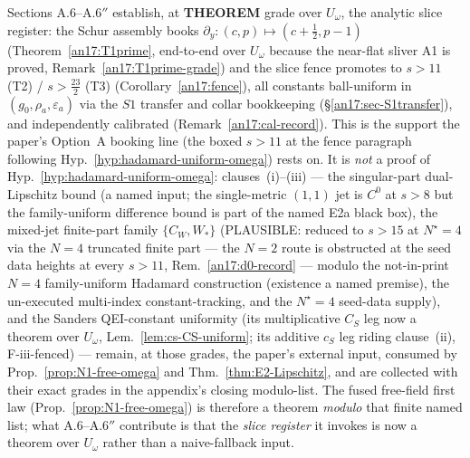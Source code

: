 \begin{remark}
\label{an17:slice-verdict}
Sections A.6--A.6$''$ establish, at \textbf{THEOREM} grade over $U_\omega$, the
analytic slice register: the Schur assembly books
$\partial_y:(c,p)\mapsto(c+\tfrac12,p-1)$ (Theorem~\ref{an17:T1prime}, end-to-end
over $U_\omega$ because the near-flat sliver A1 is proved,
Remark~\ref{an17:T1prime-grade}) and the slice fence promotes to $s>11$ (T2) /
$s>\tfrac{23}{2}$ (T3) (Corollary~\ref{an17:fence}), all constants ball-uniform in
$(g_0,\rho_a,\varepsilon_a)$ via the $S1$ transfer and collar bookkeeping
(\S\ref{an17:sec-S1transfer}), and independently calibrated
(Remark~\ref{an17:cal-record}). This is the support the paper's Option~A booking
line \textup{(}the boxed $s>11$ at the fence paragraph following
Hyp.~\ref{hyp:hadamard-uniform-omega}\textup{)} rests on. It is \emph{not} a proof
of Hyp.~\ref{hyp:hadamard-uniform-omega}: clauses~(i)--(iii) --- the singular-part
dual-Lipschitz bound (a named input; the single-metric $(1,1)$ jet is $C^0$ at
$s>8$ but the family-uniform difference bound is part of the named E2a black box),
the mixed-jet finite-part family $\{C_W,W_*\}$ (PLAUSIBLE: reduced to $s>15$ at
$N^\star{=}4$ via the $N{=}4$ truncated finite part --- the $N{=}2$ route is
obstructed at the seed data heights at every $s>11$, Rem.~\ref{an17:d0-record} ---
modulo the not-in-print $N{=}4$ family-uniform Hadamard construction (existence a
named premise), the un-executed multi-index constant-tracking, and the
$N^\star{=}4$ seed-data supply), and the Sanders QEI-constant uniformity (its
multiplicative $C_S$ leg now a theorem over $U_\omega$,
Lem.~\ref{lem:cs-CS-uniform}; its additive $c_S$ leg riding clause~(ii),
F-iii-fenced) --- remain, at those grades, the paper's external input,
consumed by Prop.~\ref{prop:N1-free-omega} and Thm.~\ref{thm:E2-Lipschitz}, and
are collected with their exact grades in the appendix's closing modulo-list. The
fused free-field first law (Prop.~\ref{prop:N1-free-omega}) is therefore a
theorem \emph{modulo} that finite named list; what A.6--A.6$''$ contribute is that
the \emph{slice register} it invokes is now a theorem over $U_\omega$ rather than
a naive-fallback input.
\end{remark}


